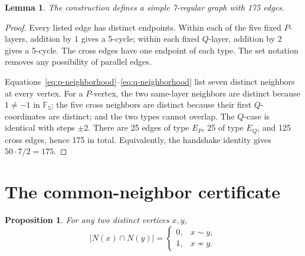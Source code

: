 \documentclass[a4paper,11pt,reqno]{amsart}
\theoremstyle{plain}
\newtheorem{proposition}[theorem]{Proposition}
\newtheorem{lemma}[theorem]{Lemma}
\theoremstyle{definition}
\theoremstyle{remark}
\newcommand{\F}{\mathbb F_5}
\begin{document}
\begin{lemma}\label{lem:simple-regular}
The construction defines a simple 7-regular graph with 175 edges.
\end{lemma}

\begin{proof}
Every listed edge has distinct endpoints.  Within each of the five fixed
\(P\)-layers, addition by \(1\) gives a 5-cycle; within each fixed
\(Q\)-layer, addition by \(2\) gives a 5-cycle.  The cross edges have one
endpoint of each type.  The set notation removes any possibility of parallel
edges.

Equations~\eqref{eq:p-neighborhood}--\eqref{eq:q-neighborhood} list seven
distinct neighbors at every vertex.  For a \(P\)-vertex, the two same-layer
neighbors are distinct because \(1\ne-1\) in \(\F\); the five cross
neighbors are distinct because their first \(Q\)-coordinates are distinct;
and the two types cannot overlap.  The \(Q\)-case is identical with steps
\(\pm2\).  There are 25 edges of type \(E_P\), 25 of type \(E_Q\), and 125
cross edges, hence 175 in total.  Equivalently, the handshake identity gives
\(50\cdot7/2=175\).
\end{proof}

\section{The common-neighbor certificate}

\begin{proposition}\label{prop:common-neighbors}
For any two distinct vertices \(x,y\),
\[
 |N(x)\cap N(y)|=
 \begin{cases}
 0,&x\sim y,\\
 1,&x\not\sim y.
 \end{cases}
\]
\end{proposition}
\end{document}
